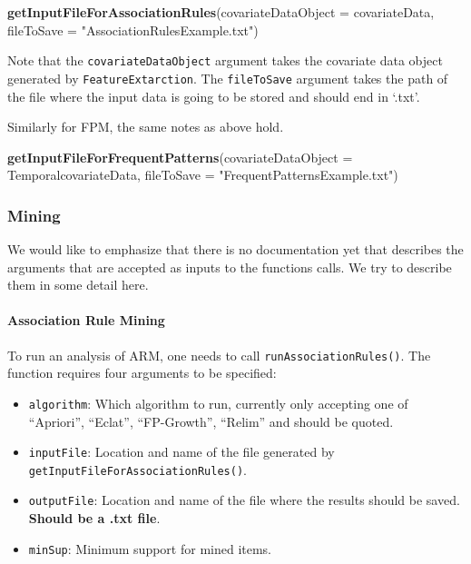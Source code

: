 \documentclass[
]{article}
\newenvironment{Shaded}{\begin{snugshade}}{\end{snugshade}}
\newcommand{\DataTypeTok}[1]{\textcolor[rgb]{0.13,0.29,0.53}{#1}}
\newcommand{\KeywordTok}[1]{\textcolor[rgb]{0.13,0.29,0.53}{\textbf{#1}}}
\newcommand{\NormalTok}[1]{#1}
\newcommand{\StringTok}[1]{\textcolor[rgb]{0.31,0.60,0.02}{#1}}
\providecommand{\tightlist}{%
  \setlength{\itemsep}{0pt}\setlength{\parskip}{0pt}}
\begin{document}
\begin{Shaded}
\begin{Highlighting}[]
\KeywordTok{getInputFileForAssociationRules}\NormalTok{(}\DataTypeTok{covariateDataObject =}\NormalTok{ covariateData, }\DataTypeTok{fileToSave =} \StringTok{"AssociationRulesExample.txt"}\NormalTok{)}
\end{Highlighting}
\end{Shaded}

Note that the \texttt{covariateDataObject} argument takes the covariate
data object generated by \texttt{FeatureExtarction}. The
\texttt{fileToSave} argument takes the path of the file where the input
data is going to be stored and should end in `.txt'.

Similarly for FPM, the same notes as above hold.

\begin{Shaded}
\begin{Highlighting}[]
\KeywordTok{getInputFileForFrequentPatterns}\NormalTok{(}\DataTypeTok{covariateDataObject =}\NormalTok{ TemporalcovariateData, }\DataTypeTok{fileToSave =} \StringTok{"FrequentPatternsExample.txt"}\NormalTok{)}
\end{Highlighting}
\end{Shaded}

\hypertarget{mining}{%
\subsubsection{Mining}\label{mining}}

We would like to emphasize that there is no documentation yet that
describes the arguments that are accepted as inputs to the functions
calls. We try to describe them in some detail here.

\hypertarget{association-rule-mining}{%
\paragraph{Association Rule Mining}\label{association-rule-mining}}

To run an analysis of ARM, one needs to call
\texttt{runAssociationRules()}. The function requires four arguments to
be specified:

\begin{itemize}
\tightlist
\item
  \texttt{algorithm}: Which algorithm to run, currently only accepting
  one of ``Apriori'', ``Eclat'', ``FP-Growth'', ``Relim'' and should be
  quoted.\\
\item
  \texttt{inputFile}: Location and name of the file generated by
  \texttt{getInputFileForAssociationRules()}.\\
\item
  \texttt{outputFile}: Location and name of the file where the results
  should be saved. \textbf{Should be a .txt file}.\\
\item
  \texttt{minSup}: Minimum support for mined items.
\end{itemize}
\end{document}
